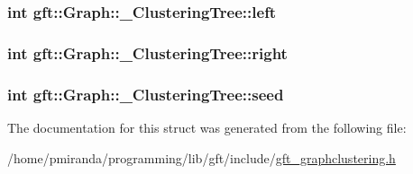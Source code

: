 \subsubsection[{\texorpdfstring{left}{left}}]{\setlength{\rightskip}{0pt plus 5cm}int gft\+::\+Graph\+::\+\_\+\+Clustering\+Tree\+::left}\hypertarget{structgft_1_1Graph_1_1__ClusteringTree_a8ab019740ed0e9fd7f33bc9b15f38c1e}{}\label{structgft_1_1Graph_1_1__ClusteringTree_a8ab019740ed0e9fd7f33bc9b15f38c1e}
\subsubsection[{\texorpdfstring{right}{right}}]{\setlength{\rightskip}{0pt plus 5cm}int gft\+::\+Graph\+::\+\_\+\+Clustering\+Tree\+::right}\hypertarget{structgft_1_1Graph_1_1__ClusteringTree_ac4fb245b23f6fad40fb1b65522b8556d}{}\label{structgft_1_1Graph_1_1__ClusteringTree_ac4fb245b23f6fad40fb1b65522b8556d}
\subsubsection[{\texorpdfstring{seed}{seed}}]{\setlength{\rightskip}{0pt plus 5cm}int gft\+::\+Graph\+::\+\_\+\+Clustering\+Tree\+::seed}\hypertarget{structgft_1_1Graph_1_1__ClusteringTree_abf12465052dd18a231fe816330ab737c}{}\label{structgft_1_1Graph_1_1__ClusteringTree_abf12465052dd18a231fe816330ab737c}


The documentation for this struct was generated from the following file\+:\begin{DoxyCompactItemize}
\item 
/home/pmiranda/programming/lib/gft/include/\hyperlink{gft__graphclustering_8h}{gft\+\_\+graphclustering.\+h}\end{DoxyCompactItemize}
